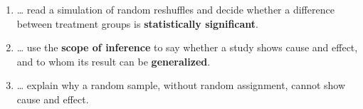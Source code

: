 \documentclass[12pt]{article}
\begin{document}

\namedateperiod
\vspace{0.18in}

\boxguard[14]
\begin{learningtargetbox}
\small
\begin{enumerate}[leftmargin=1.5em, itemsep=5pt]
  \item \ldots{} read a simulation of random reshuffles and decide whether a difference
        between treatment groups is \textbf{statistically significant}.
  \item \ldots{} use the \textbf{scope of inference} to say whether a study shows cause and
        effect, and to whom its result can be \textbf{generalized}.
  \item \ldots{} explain why a random sample, without random assignment, cannot show cause
        and effect.
\end{enumerate}
\end{learningtargetbox}

\vspace{0.14in}
\end{document}
